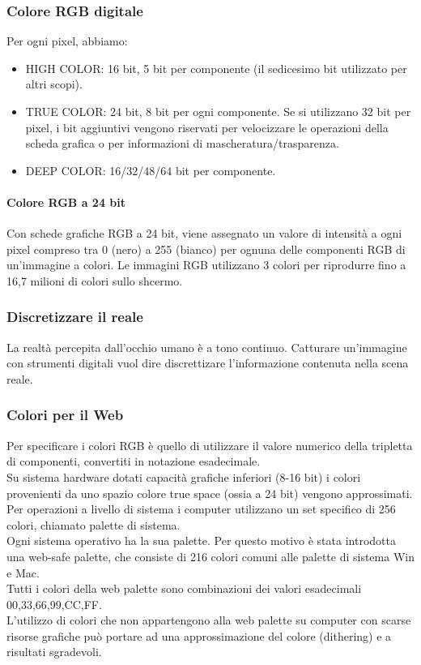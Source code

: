 \documentclass{article}
\begin{document}
\subsubsection{Colore RGB digitale}
Per ogni pixel, abbiamo:
\begin{itemize}
\item HIGH COLOR: 16 bit, 5 bit per componente (il sedicesimo bit utilizzato per altri scopi).
\item TRUE COLOR: 24 bit, 8 bit per ogni componente. Se si utilizzano 32 bit per pixel, i bit aggiuntivi vengono riservati per velocizzare le operazioni della scheda grafica o per informazioni di mascheratura/trasparenza.
\item DEEP COLOR: 16/32/48/64 bit per componente.
\end{itemize}
\paragraph{Colore RGB a 24 bit\\}
Con schede grafiche RGB a 24 bit, viene assegnato un valore di intensità a ogni pixel compreso tra 0 (nero) a 255 (bianco) per ognuna delle componenti RGB di un'immagine a colori.
Le immagini RGB utilizzano 3 colori per riprodurre fino a 16,7 milioni di colori sullo shcermo.
\subsubsection{Discretizzare il reale}
La realtà percepita dall'occhio umano è a tono continuo. Catturare un'immagine con strumenti digitali vuol dire discrettizare l'informazione contenuta nella scena reale.
\subsubsection{Colori per il Web}
Per specificare i colori RGB è quello di utilizzare il valore numerico della tripletta di componenti, convertiti in notazione esadecimale.\\
Su sistema hardware dotati capacità grafiche inferiori (8-16 bit) i colori provenienti da uno spazio colore true space (ossia a 24 bit) vengono approssimati. \\
Per operazioni a livello di sistema i computer utilizzano un set specifico di 256 colori, chiamato palette di sistema.\\
Ogni sistema operativo ha la sua palette. Per questo motivo è stata introdotta una web-safe palette, che consiste di 216 colori comuni alle palette di sistema Win e Mac.\\
Tutti i colori della web palette sono combinazioni dei valori esadecimali 00,33,66,99,CC,FF.\\
L'utilizzo di colori che non appartengono alla web palette su computer con scarse risorse grafiche può portare ad una approssimazione del colore (dithering) e a risultati sgradevoli.\\
\end{document}
